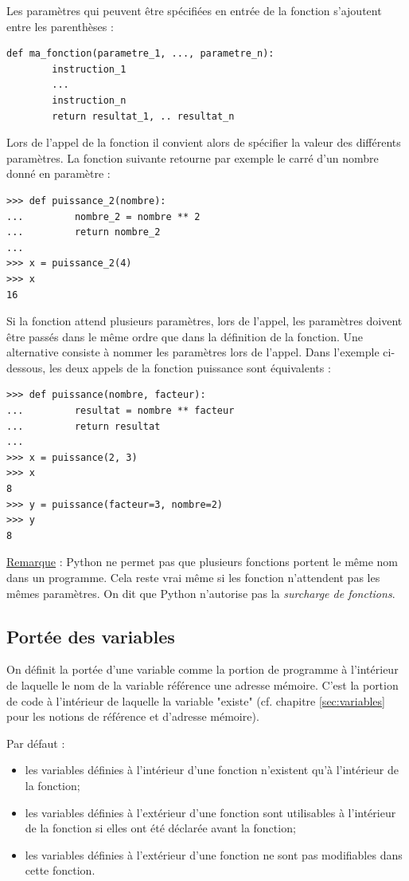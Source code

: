 \documentclass[12pt, a4paper]{article}
\begin{document}
Les paramètres qui peuvent être spécifiées en entrée de la fonction s'ajoutent entre les parenthèses :
\begin{lstlisting}
def ma_fonction(parametre_1, ..., parametre_n):
		instruction_1
		...
		instruction_n
		return resultat_1, .. resultat_n
\end{lstlisting}

Lors de l'appel de la fonction il convient alors de spécifier la valeur des différents paramètres. La fonction suivante retourne par exemple le carré d'un nombre donné en paramètre :
\begin{lstlisting}
>>> def puissance_2(nombre):
...			nombre_2 = nombre ** 2
... 		return nombre_2
...
>>> x = puissance_2(4)
>>> x
16
\end{lstlisting}

Si la fonction attend plusieurs paramètres, lors de l'appel, les paramètres doivent être passés dans le même ordre que dans la définition de la fonction. Une alternative consiste à nommer les paramètres lors de l'appel. Dans l'exemple ci-dessous, les deux appels de la fonction puissance sont équivalents :
\begin{lstlisting}
>>> def puissance(nombre, facteur):
...			resultat = nombre ** facteur
... 		return resultat
...
>>> x = puissance(2, 3)
>>> x
8
>>> y = puissance(facteur=3, nombre=2)
>>> y
8
\end{lstlisting}

\underline{Remarque} : Python ne permet pas que plusieurs fonctions portent le même nom dans un programme. Cela reste vrai même si les fonction n'attendent pas les mêmes paramètres. On dit que Python n'autorise pas la \textit{surcharge de fonctions}.


\subsection{Portée des variables}
On définit la portée d'une variable comme la portion de programme à l'intérieur de laquelle le nom de la variable référence une adresse mémoire. C'est la portion de code à l'intérieur de laquelle la variable "existe" (cf. chapitre \ref{sec:variables} pour les notions de référence et d'adresse mémoire).

Par défaut :
\begin{itemize}
	\item les variables définies à l'intérieur d'une fonction n'existent qu'à l'intérieur de la fonction;
	\item les variables définies à l'extérieur d'une fonction sont utilisables à l'intérieur de la fonction si elles ont été déclarée avant la fonction;
	\item les variables définies à l'extérieur d'une fonction ne sont pas modifiables dans cette fonction.
\end{itemize}
\end{document}
